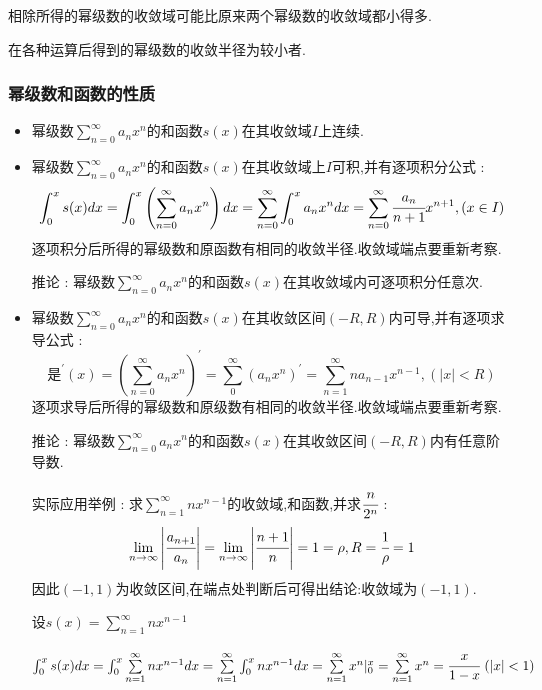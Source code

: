 \documentclass[UTF8,12pt]{ctexbook}
\newcommand{\limNormal}[1]{\lim\limits_{#1}}
\newcommand{\derivative}{^\prime}
\newcommand{\upDownSum}[2]{\sum\limits_{#2}^{#1}}
\newcommand{\definiteIntegral}[2]{\int^{#1}_{#2}}
\newcommand{\bigCase}[1]{\left(#1\right)}
\newcommand{\absoluteValue}[1]{\left\lvert #1 \right\vert}
\begin{document}
{{{{{\begin{itemize}
{          相除所得的幂级数的收敛域可能比原来两个幂级数的收敛域都小得多.
          }
  \end{itemize}

  在各种运算后得到的幂级数的收敛半径为较小者.
}%

\subsubsection{幂级数和函数的性质}{
  \begin{itemize}
    \item 幂级数$\upDownSum{\infty}{n = 0}a_nx^n$的和函数$s(x)$在其收敛域$I$上连续.
    \item {
          幂级数$\upDownSum{\infty}{n = 0}a_nx^n$的和函数$s(x)$在其收敛域上$I$可积,并有逐项积分公式 :
          $$
            \definiteIntegral{x}{0}s(x)dx = \definiteIntegral{x}{0}\bigCase{\upDownSum{\infty}{n = 0}a_nx^n}dx = \upDownSum{\infty}{n = 0}\definiteIntegral{x}{0}a_nx^ndx = \upDownSum{\infty}{n = 0}\cfrac{a_n}{n + 1}x^{n + 1},(x \in I)
          $$
          逐项积分后所得的幂级数和原函数有相同的收敛半径.收敛域端点要重新考察.

          推论 : 幂级数$\upDownSum{\infty}{n = 0}a_nx^n$的和函数$s(x)$在其收敛域内可逐项积分任意次.
          }
    \item{
          幂级数$\upDownSum{\infty}{n = 0}a_nx^n$的和函数$s(x)$在其收敛区间$(-R,R)$内可导,并有逐项求导公式 :
          $$
            是\derivative(x) = \bigCase{\upDownSum{\infty}{n = 0}a_nx^n}\derivative = \upDownSum{\infty}{0}(a_nx^n)\derivative = \upDownSum{\infty}{n = 1}na_{n - 1}x^{n - 1},(\absoluteValue{x} < R)
          $$
          逐项求导后所得的幂级数和原级数有相同的收敛半径.收敛域端点要重新考察.

          推论 : 幂级数$\upDownSum{\infty}{n = 0}a_nx^n$的和函数$s(x)$在其收敛区间$(-R,R)$内有任意阶导数.
          }

          实际应用举例 :
          求$\upDownSum{\infty}{n = 1}nx^{n - 1}$的收敛域,和函数,并求$\cfrac{n}{2^n}$ :
          $$
            \limNormal{n \to \infty}\absoluteValue{\cfrac{a_{n + 1}}{a_n}} = \limNormal{n \to \infty}\absoluteValue{\cfrac{n + 1}{n}} = 1 = \rho,R = \cfrac{1}{\rho} = 1
          $$
          因此$(-1,1)$为收敛区间,在端点处判断后可得出结论:收敛域为$(-1,1)$.

          设$s(x) = \upDownSum{\infty}{n = 1}nx^{n - 1}$

          \begin{math}
            \definiteIntegral{x}{0}s(x)dx
            = \definiteIntegral{x}{0}\upDownSum{\infty}{n = 1}nx^{n - 1}dx \\
            = \upDownSum{\infty}{n = 1}\definiteIntegral{x}{0}nx^{n - 1}dx \\
            = \upDownSum{\infty}{n = 1}x^n|^x_0 \\
            = \upDownSum{\infty}{n = 1}x^n \\
            =\cfrac{x}{1 - x}\ (\absoluteValue{x} < 1)
          \end{math}


\end{itemize}}}}}}
\end{document}
